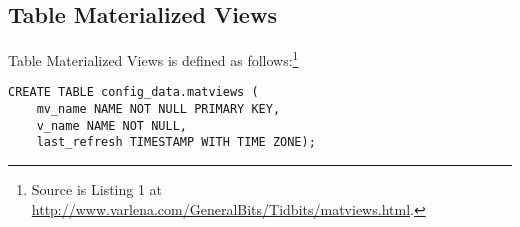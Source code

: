 \subsection{Table Materialized Views}\label{subsec_tab_matviews}

Table Materialized Views is defined as follows:\footnote{Source is Listing 1 at \url{http://www.varlena.com/GeneralBits/Tidbits/matviews.html}.}
\begin{lstlisting}[language=postgreSQL] 
CREATE TABLE config_data.matviews ( 
	mv_name NAME NOT NULL PRIMARY KEY, 
	v_name NAME NOT NULL,  
	last_refresh TIMESTAMP WITH TIME ZONE);
\end{lstlisting}
